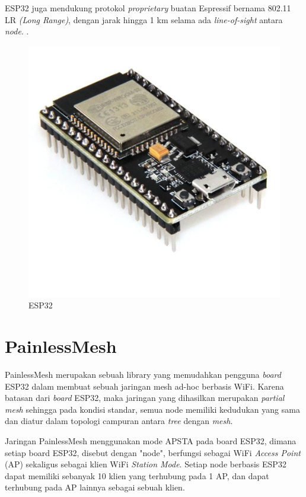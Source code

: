 ESP32 juga mendukung protokol \textit{proprietary} buatan Espressif bernama 802.11 LR \textit{(Long Range)}, dengan jarak hingga 1 km selama ada \textit{line-of-sight} antara \textit{node}. \cite{WiFiDriverESP32}.
\begin{figure}[h]
	\centering
	\includegraphics[scale=0.1]{./assets/ESP32}
	\caption{ESP32}
\end{figure}

\section{PainlessMesh}
PainlessMesh merupakan sebuah library yang memudahkan pengguna \textit{board} ESP32 dalam membuat sebuah jaringan mesh ad-hoc berbasis WiFi. Karena batasan dari \textit{board} ESP32, maka jaringan yang dihasilkan merupakan \textit{partial mesh} sehingga pada kondisi standar, semua node memiliki kedudukan yang sama dan diatur dalam topologi campuran antara \textit{tree} dengan \textit{mesh}.

Jaringan PainlessMesh menggunakan mode APSTA pada board ESP32, dimana setiap board ESP32, disebut dengan "node", berfungsi sebagai WiFi \textit{Access Point} (AP) sekaligus sebagai klien WiFi \textit{Station Mode}. Setiap node berbasis ESP32 dapat memiliki sebanyak 10 klien yang terhubung pada 1 AP, dan dapat terhubung pada AP lainnya sebagai sebuah klien.

